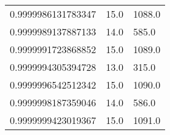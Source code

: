 \begin{center}
\begin{supertabular}[H]{p{0.30\textwidth}p{0.05\textwidth}p{0.05\textwidth}}
0.9999986131783347 & 15.0 & 1088.0 \\ 
0.9999989137887133 & 14.0 & 585.0 \\ 
0.9999991723868852 & 15.0 & 1089.0 \\ 
0.9999994305394728 & 13.0 & 315.0 \\ 
0.9999996542512342 & 15.0 & 1090.0 \\ 
0.9999998187359046 & 14.0 & 586.0 \\ 
0.9999999423019367 & 15.0 & 1091.0 \\ 
\end{supertabular}
\end{center}
